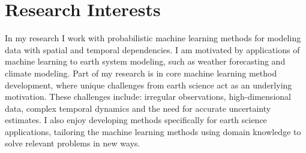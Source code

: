 \section*{Research Interests}
In my research I work with probabilistic machine learning methods for modeling data with spatial and temporal dependencies.
I am motivated by applications of machine learning to earth system modeling, such as weather forecasting and climate modeling.
Part of my research is in core machine learning method development, where unique challenges from earth science act as an underlying motivation.
These challenges include: irregular observations, high-dimensional data, complex temporal dynamics and the need for accurate uncertainty estimates.
I also enjoy developing methods specifically for earth science applications, tailoring the machine learning methods using domain knowledge to solve relevant problems in new ways.
